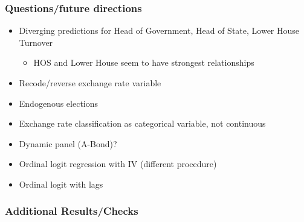 \documentclass[]{beamer}
\begin{document}
\begin{frame}
    \frametitle{Questions/future directions}
    \begin{itemize}
        \item Diverging predictions for Head of Government, Head of State, Lower House Turnover
        \begin{itemize}
            \item HOS and Lower House seem to have strongest relationships
        \end{itemize}
        \item Recode/reverse exchange rate variable
        \item Endogenous elections
        \item Exchange rate classification as categorical variable, not continuous
        \item Dynamic panel (A-Bond)?
        \item Ordinal logit regression with IV (different procedure)
        \item Ordinal logit with lags
    \end{itemize}
\end{frame}


\begin{frame}
    \frametitle{Additional Results/Checks}
\end{frame}
\end{document}
